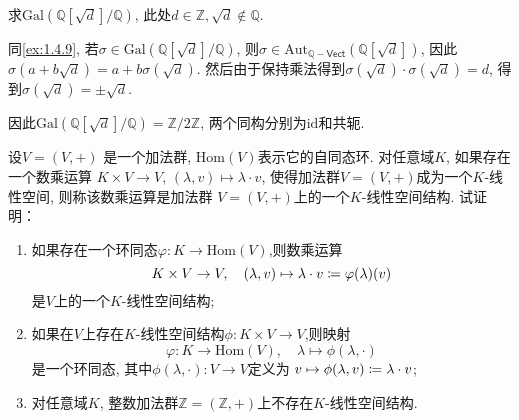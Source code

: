 \begin{problem}
    求$\mathrm{Gal}\left(\mathbb{Q}[\sqrt{d}]/\mathbb{Q}\right)$,
此处$d \in \mathbb{Z}, \sqrt{d} \notin \mathbb{Q}$.
\end{problem}

\begin{solution}
    同\ref{ex:1.4.9}, 若$\sigma \in \mathrm{Gal}\left(\mathbb{Q}[\sqrt{d}]/\mathbb{Q}\right)$, 则$\sigma \in \mathrm{Aut}_{\mathbb{Q}-\mathsf{Vect}}\left(\mathbb{Q}[\sqrt{d}]\right)$, 因此$\sigma(a + b\sqrt{d}) = a + b\sigma(\sqrt{d})$. 然后由于保持乘法得到$\sigma(\sqrt{d}) \cdot \sigma(\sqrt{d}) = d$, 得到$\sigma(\sqrt{d}) = \pm\sqrt{d}$.

    因此$\mathrm{Gal}\left(\mathbb{Q}[\sqrt{d}]/\mathbb{Q}\right) = \mathbb{Z}/2\mathbb{Z}$,
    两个同构分别为$\mathrm{id}$和共轭.
\end{solution}

\begin{problem}\label{ex:1.4.13}
    设$V = (V, +)$ 是一个加法群, $\mathrm{Hom}(V)$表示它的自同态环.
对任意域$K$, 如果存在一个数乘运算
$K \times V \to V,\, (\lambda,v) \mapsto \lambda \cdot v$,
使得加法群$V = (V, +)$成为一个$K$-线性空间, 则称该数乘运算是加法群
$V = (V, +)$上的一个$K$-线性空间结构. 试证明：
\begin{enumerate}[(1)]
    \item 如果存在一个环同态$\varphi:K \to \mathrm{Hom}(V)$,则数乘运算
\[
    K \times V \to V,\quad (\lambda, v) \mapsto \lambda \cdot v \mathrel{\coloneqq} \varphi(\lambda)(v)
\]
是$V$上的一个$K$-线性空间结构;
    \item 如果在$V$上存在$K$-线性空间结构$\phi:K \times V \to V$,则映射
\[
    \varphi:K \to \mathrm{Hom}(V),\quad \lambda \mapsto \phi(\lambda, \cdot)
\]
是一个环同态, 其中$\phi(\lambda, \cdot):V \to V$定义为
$v \mapsto \phi(\lambda, v) \mathrel{\coloneqq} \lambda \cdot v$;
    \item 对任意域$K$, 整数加法群$\mathbb{Z} = (\mathbb{Z}, +)$上不存在$K$-线性空间结构.
\end{enumerate}
\end{problem}

